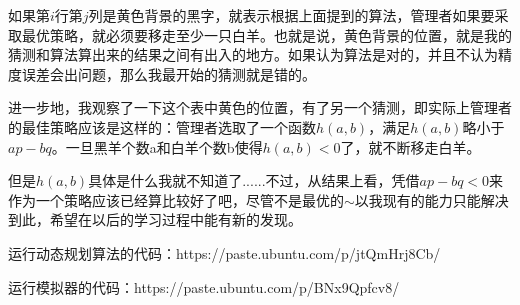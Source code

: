 \documentclass{article}
\begin{document}
	如果第$i$行第$j$列是黄色背景的黑字，就表示根据上面提到的算法，管理者如果要采取最优策略，就必须要移走至少一只白羊。也就是说，黄色背景的位置，就是我的猜测和算法算出来的结果之间有出入的地方。如果认为算法是对的，并且不认为精度误差会出问题，那么我最开始的猜测就是错的。
	
	进一步地，我观察了一下这个表中黄色的位置，有了另一个猜测，即实际上管理者的最佳策略应该是这样的：管理者选取了一个函数$h(a,b)$，满足$h(a,b)$略小于$ap-bq$。一旦黑羊个数a和白羊个数b使得$h(a,b)<0$了，就不断移走白羊。
	
	但是$h(a,b)$具体是什么我就不知道了......不过，从结果上看，凭借$ap-bq<0$来作为一个策略应该已经算比较好了吧，尽管不是最优的$\sim$以我现有的能力只能解决到此，希望在以后的学习过程中能有新的发现。
	
	运行动态规划算法的代码：https://paste.ubuntu.com/p/jtQmHrj8Cb/
	
	运行模拟器的代码：https://paste.ubuntu.com/p/BNx9Qpfcv8/
\end{document}
